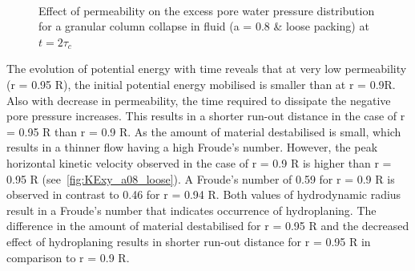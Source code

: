 \begin{figure}
\centering
{}\\
\caption{Effect of permeability on the excess pore water pressure distribution 
for a granular column collapse in fluid (a = 0.8 \& loose packing) at $t = 
2\tau_c$}
\label{fig:Loose_PWP_flow}
\end{figure}

The evolution of potential energy with time reveals that at very low 
permeability (r = 0.95 R), the initial potential energy mobilised is smaller 
than at r = 0.9R. Also with decrease in permeability, the time required to 
dissipate the negative pore pressure increases. This results in a shorter 
run-out distance in the case of r = 0.95 R than r = 0.9 R. As the amount of 
material destabilised is small, which results in a thinner flow having a high 
Froude's number. However, the peak horizontal kinetic velocity observed in the 
case of r = 0.9 R is higher than r = 0.95 R (see~\cref{fig:KExy_a08_loose}).  A 
Froude's number of 0.59 for r = 0.9 R is observed in contrast to 0.46 for r = 
0.94 R. Both values of hydrodynamic radius result in a Froude's number that 
indicates occurrence of hydroplaning. The difference in the amount of material 
destabilised for r = 0.95 R and the decreased effect of hydroplaning results in 
shorter run-out distance for r = 0.95 R in comparison to r = 0.9 R. 


